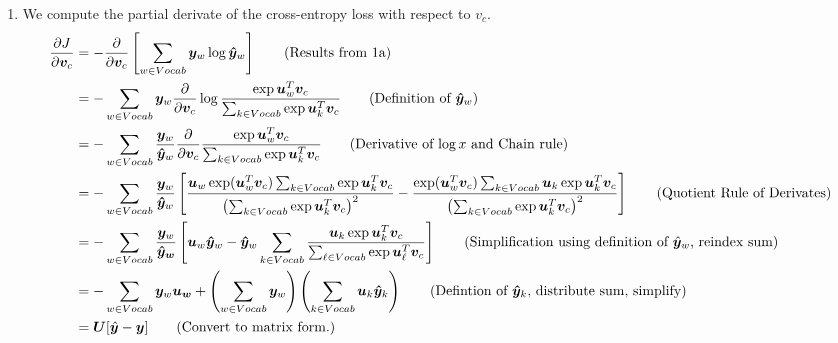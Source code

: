 \documentclass[12pt]{article}
\begin{document}
\begin{enumerate}[label=(\alph*)]
\item We compute the partial derivate of the cross-entropy loss with respect to $v_c$.
\begin{align*}
\frac{\partial J}{\partial \bm{v}_c} &= -\frac{\partial}{\partial \bm{v}_c} \left[ \sum_{w \in Vocab} \bm{y}_w \log \bm{\hat{y}}_w \right] \tag{Results from 1a} \\
&= -\sum_{w \in Vocab} \bm{y}_w \frac{\partial}{\partial \bm{v}_c} \log \frac{\exp{\bm{u}_w^T\bm{v}_c}}{\sum_{k \in Vocab} \exp{\bm{u}_k^T \bm{v}_c}} \tag{Definition of $\bm{\hat{y}}_w$} \\
&= -\sum_{w \in Vocab} \frac{\bm{y}_w}{\bm{\hat{y}}_w} \frac{\partial}{\partial \bm{v}_c} \frac{\exp{\bm{u}_w^T} \bm{v}_c}{\sum_{k \in Vocab} \exp{\bm{u}_k^T \bm{v}_c}} \tag{Derivative of $\log x$ and Chain rule} \\
&= - \sum_{w \in Vocab} \frac{\bm{y}_w}{\bm{\hat{y}}_w} \left[ \frac{\bm{u}_w\exp(\bm{u}_w^T \bm{v}_c)\sum_{k \in Vocab} \exp \bm{u}_k^T \bm{v}_c}{\left(\sum_{k \in Vocab} \exp \bm{u}_k^T \bm{v}_c \right)^2} - \frac{\exp(\bm{u}_w^T \bm{v}_c)\sum_{k \in Vocab} \bm{u}_k \exp \bm{u}_k^T \bm{v}_c}{\left(\sum_{k \in Vocab}\exp \bm{u}_k^T\bm{v}_c \right)^2} \right] \tag{Quotient Rule of Derivates} \\
&= -\sum_{w \in Vocab} \frac{\bm{y}_w}{\bm{\hat{y}_w}} \left[\bm{u}_w \bm{\hat{y}}_w - \bm{\hat{y}}_w \sum_{k \in Vocab} \frac{\bm{u}_k \exp{\bm{u}_k^T \bm{v}_c}}{\sum_{\ell \in Vocab} \exp{\bm{u}_{\ell}^T \bm{v}_c}} \right] \tag{Simplification using definition of $\hat{\bm{y}}_w$, reindex sum} \\
&= -\sum_{w \in Vocab} \bm{y}_w \bm{u_w} + \left(\sum_{w \in Vocab} \bm{y}_w\right)\left(\sum_{k \in Vocab} \bm{u}_k \bm{\hat{y}}_k  \right) \tag{Defintion of $\bm{\hat{y}}_k$, distribute sum, simplify} \\
&= \bm{U}[\hat{\bm{y}} - \bm{y}] \tag{Convert to matrix form.}
\end{align*}


\end{enumerate}
\end{document}
